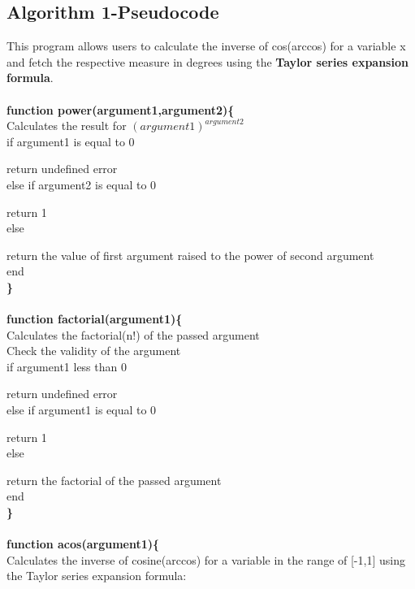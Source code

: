 \documentclass[12pt]{report}
\begin{document}
		\subsection{Algorithm 1-Pseudocode}
		This program allows users to calculate the inverse of cos(arccos) for a variable x and fetch the respective measure in degrees using the \textbf{Taylor series expansion formula}.\\\\
		\textbf{function power(argument1,argument2)\{}\\
			Calculates the result for $(argument1)^{argument2}$\\
			if argument1 is equal to 0\par
			\vspace{-0.3cm}return undefined error\\
			else if argument2 is equal to 0\par
			\vspace{-0.3cm}return 1\\
			else\par
			\vspace{-0.3cm}return the value of first argument raised to the power of second argument\\
			end\\
		\textbf{\}}\\\\
		\textbf{function factorial(argument1)\{}\\
			Calculates the factorial(n!) of the passed argument\\
			Check the validity of the argument\\
			if argument1 less than 0\par
			\vspace{-0.3cm}return undefined error\\
			else if argument1 is equal to 0\par
			\vspace{-0.3cm}return 1\\
			else\par
			\vspace{-0.3cm}return the factorial of the passed argument\\
			end\\
		\textbf{\}}\\\\
		\textbf{function acos(argument1)\{}\\
			Calculates the inverse of cosine(arccos) for a variable in the range of [-1,1] using the Taylor series expansion formula:\\\\
\end{document}
